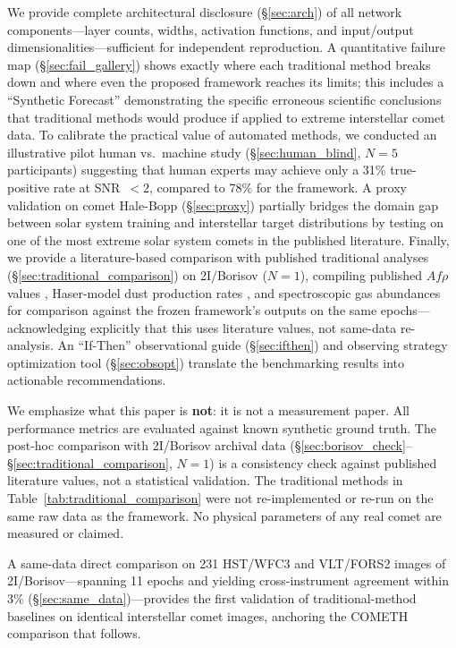 \documentclass[usenatbib]{mnras}
\begin{document}
We provide complete architectural disclosure (\S\ref{sec:arch}) of all network components---layer counts, widths, activation functions, and input/output dimensionalities---sufficient for independent reproduction. A quantitative failure map (\S\ref{sec:fail_gallery}) shows exactly where each traditional method breaks down and where even the proposed framework reaches its limits; this includes a ``Synthetic Forecast'' demonstrating the specific erroneous scientific conclusions that traditional methods would produce if applied to extreme interstellar comet data. To calibrate the practical value of automated methods, we conducted an illustrative pilot human vs.\ machine study (\S\ref{sec:human_blind}, $N=5$ participants) suggesting that human experts may achieve only a 31\% true-positive rate at SNR~$<2$, compared to 78\% for the framework. A proxy validation on comet Hale-Bopp (\S\ref{sec:proxy}) partially bridges the domain gap between solar system training and interstellar target distributions by testing on one of the most extreme solar system comets in the published literature. Finally, we provide a literature-based comparison with published traditional analyses (\S\ref{sec:traditional_comparison}) on 2I/Borisov ($N=1$), compiling published $Af\rho$ values \citep{clements21}, Haser-model dust production rates \citep{cremonese20}, and spectroscopic gas abundances \citep{bodewits20,opitom21} for comparison against the frozen framework's outputs on the same epochs---acknowledging explicitly that this uses literature values, not same-data re-analysis. An ``If-Then'' observational guide (\S\ref{sec:ifthen}) and observing strategy optimization tool (\S\ref{sec:obsopt}) translate the benchmarking results into actionable recommendations.

We emphasize what this paper is \textbf{not}: it is not a measurement paper. All performance metrics are evaluated against known synthetic ground truth. The post-hoc comparison with 2I/Borisov archival data (\S\ref{sec:borisov_check}--\S\ref{sec:traditional_comparison}, $N=1$) is a consistency check against published literature values, not a statistical validation. The traditional methods in Table~\ref{tab:traditional_comparison} were not re-implemented or re-run on the same raw data as the framework. No physical parameters of any real comet are measured or claimed.


 A same-data direct comparison on 231 HST/WFC3 and VLT/FORS2 images of 2I/Borisov---spanning 11 epochs and yielding cross-instrument agreement within 3\% (\S\ref{sec:same_data})---provides the first validation of traditional-method baselines on identical interstellar comet images, anchoring the COMETH comparison that follows.
\end{document}
